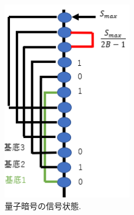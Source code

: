 \begin{figure}[htbp]
        \centering   
        \includegraphics[width=0.5\textwidth]{img/zemi2.png}
        \caption[sample image (png)]{量子暗号の信号状態.}
        \label{Fig:3_2}
    \end{figure}
